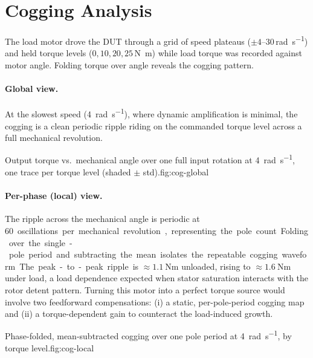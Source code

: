 \documentclass[11pt]{article}
\begin{document}
\section{Cogging Analysis}\label{sec:cogging}
The load motor drove the DUT through a grid of speed plateaus
($\pm 4\text{--}30$\,\si{\radian\per\second}) and held torque levels
($0,10,20,25$\,\si{\newton\meter}) while load torque was recorded against motor
angle. Folding torque over angle reveals the cogging pattern.

\paragraph{Global view.} At the slowest speed (\SI{4}{\radian\per\second}), where
dynamic amplification is minimal, the cogging is a clean periodic ripple riding on
the commanded torque level across a full mechanical revolution.

  {Output torque vs.\ mechanical angle over one full input rotation at
   \SI{4}{\radian\per\second}, one trace per torque level (shaded $\pm$ std).}{fig:cog-global}

\paragraph{Per-phase (local) view.} The ripple across the mechanical angle is periodic at \SI{60} oscillations per mechanical revolution, representing the pole count.
Folding over the single-pole period and
subtracting the mean isolates the repeatable cogging waveform. The peak-to-peak
ripple is $\approx\SI{1.1}{\newton\meter}$ unloaded, rising to
$\approx\SI{1.6}{\newton\meter}$ under load, a
load dependence expected when stator saturation interacts with the rotor detent pattern.
Turning this motor into a perfect torque source would involve two feedforward compensations: (i) a static, per-pole-period cogging map and (ii) a torque-dependent gain to counteract the load-induced growth.

  {Phase-folded, mean-subtracted cogging over one pole period at
   \SI{4}{\radian\per\second}, by torque level.}{fig:cog-local}
\end{document}
